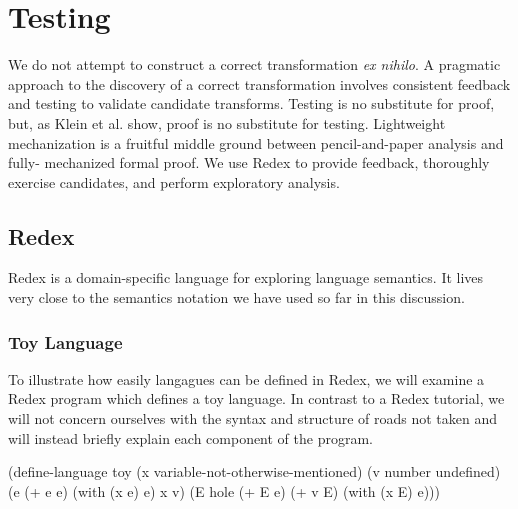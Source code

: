 \chapter{Testing}

We do not attempt to construct a correct transformation \emph{ex nihilo}. A pragmatic
approach to the discovery of a correct transformation involves consistent feedback and
testing to validate candidate transforms. Testing is no substitute for proof, but, as
Klein et al. \cite{klein2012run} show, proof is no substitute for testing. Lightweight
mechanization is a fruitful middle ground between pencil-and-paper analysis and fully-
mechanized formal proof. We use Redex to provide feedback, thoroughly exercise candidates,
and perform exploratory analysis.

\section{Redex}

Redex \cite{findler2010redex} is a domain-specific language for exploring language
semantics. It lives very close to the semantics notation we have used so far in this
discussion.

\subsection{Toy Language}
To illustrate how easily langagues can be defined in Redex, we will examine a Redex
program which defines a toy language. In contrast to a Redex tutorial, we will not concern
ourselves with the syntax and structure of roads not taken and will instead briefly
explain each component of the program.

\begin{schemeblock}
\begin{schemedisplay}
(define-language toy
  (x variable-not-otherwise-mentioned)
  (v number undefined) 
  (e (+ e e) (with (x e) e) x v)
  (E hole (+ E e) (+ v E) (with (x E) e)))
\end{schemedisplay}
\end{schemeblock}

